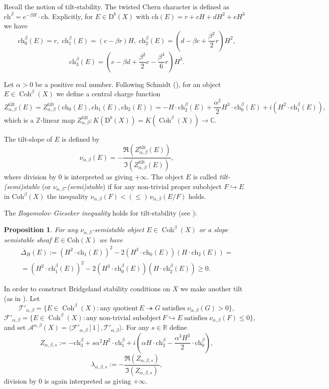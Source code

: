 \documentclass{amsart}
\newcommand{\Coh}{\operatorname{Coh}}
\newcommand{\into}{\hookrightarrow}
\newcommand{\onto}{\twoheadrightarrow}
\newtheorem{proposition}[theorem]{Proposition}
\begin{document}
	Recall the notion of tilt-stability. The twisted Chern character is defined as $\mathrm{ch}^\beta=e^{-\beta H}\cdot\mathrm{ch}$. Explicitly, for $E\in \mathrm D^b(X)$ with $\mathrm{ch}(E)=r+cH+dH^2+eH^3$ we have
	$$\mathrm{ch}_0^\beta(E)=r,\; \mathrm{ch}_1^\beta(E)=(c-\beta r)H,\; \mathrm{ch}_2^\beta(E)=(d-\beta c+\frac{\beta^2}{2} r)H^2,$$
	$$\mathrm{ch}_3^\beta(E)=(e-\beta d+\frac{\beta^2}{2}c-\frac{\beta^3}{6}r)H^3.$$
	
	Let $\alpha>0$ be a positive real number. Following Schmidt (\cite{Sch14,Sch19}), for an object $E\in\Coh^\beta(X)$ we define a central charge function
	$$Z^{\mathrm{tilt}}_{\alpha,\beta}(E)=Z^{\mathrm{tilt}}_{\alpha,\beta}(\mathrm{ch}_0(E),\mathrm{ch}_1(E),\mathrm{ch}_2(E))=-H\cdot\mathrm{ch}_2^\beta(E)+\frac{\alpha^2}{2}H^3\cdot\mathrm{ch}_0^\beta(E)+i(H^2\cdot\mathrm{ch}_1^\beta(E)),$$
	which is a $\mathbb Z$-linear map $Z^{\mathrm{tilt}}_{\alpha,\beta}:K(\mathrm D^b(X))=K(\Coh^\beta(X))\to\mathbb C$.
	
	The tilt-slope of $E$ is defined by
	$$\nu_{\alpha,\beta}(E)=-\frac{\Re(Z^{\mathrm{tilt}}_{\alpha,\beta}(E))}{\Im(Z^{\mathrm{tilt}}_{\alpha,\beta}(E))},$$
	where division by 0 is interpreted as giving $+\infty$. The object $E$ is called \textit{tilt-(semi)stable} (or $\nu_{\alpha,\beta}$-\textit{(semi)stable}) if for any non-trivial proper subobject $F\hookrightarrow E$ in $\mathrm{Coh}^\beta(X)$ the inequality $\nu_{\alpha,\beta}(F)<(\le)\,\nu_{\alpha,\beta}(E/F)$ holds.
	
	The \textit{Bogomolov--Gieseker inequality} holds for tilt-stability (see \cite[Theorem 2.1]{MS18}):
	\begin{proposition}\label{BG} For any $\nu_{\alpha,\beta}$-semistable object $E\in\Coh^\beta(X)$ or a slope semistable sheaf $E\in\mathrm{Coh}(X)$ we have
		\begin{multline}\overline{\Delta}_H(E):=
			(H^2\cdot\mathrm{ch}_1(E))^2-2(H^3\cdot\mathrm{ch}_0(E))(H\cdot\mathrm{ch}_2(E))=\\=(H^2\cdot\mathrm{ch}_1^\beta(E))^2-2(H^3\cdot\mathrm{ch}_0^\beta(E))(H\cdot\mathrm{ch}_2^\beta(E))\ge 0.
		\end{multline}
	\end{proposition}
	
	In order to construct Bridgeland stability conditions on $X$ we make another tilt (as in \cite{BMT}). Let
	$$\mathcal T'_{\alpha,\beta}=\{E\in\Coh^\beta(X)\colon\text{any quotient}\, E\onto G\;\mathrm{satisfies}\;\nu_{\alpha,\beta}(G)>0\},$$
	$$\mathcal F'_{\alpha,\beta}=\{E\in\Coh^\beta(X)\colon\text{any non-trivial subobject}\, F\into E\;\mathrm{satisfies}\;\nu_{\alpha,\beta}(F)\le 0\},$$
	and set $\mathcal A^{\alpha,\beta}(X)=\langle \mathcal F'_{\alpha,\beta}[1],\mathcal T'_{\alpha,\beta}\rangle$. For any $s\in\mathbb R$ define
	$$Z_{\alpha,\beta,s}:=-\mathrm{ch}_3^\beta+s\alpha^2H^2\cdot\mathrm{ch}_1^\beta+i (\alpha H\cdot\mathrm{ch}_2^\beta-\frac{\alpha^3H^3}{2}\cdot\mathrm{ch}_0^\beta),$$
	$$\lambda_{\alpha,\beta,s}:=-\frac{\Re(Z_{\alpha,\beta,s})}{\Im(Z_{\alpha,\beta,s})},$$
	division by 0 is again interpreted as giving $+\infty$.
	
\end{document}
